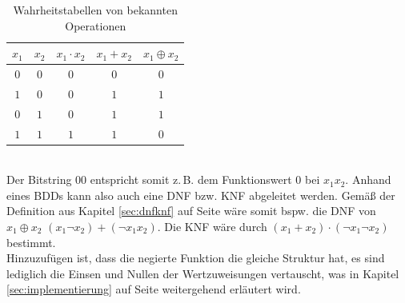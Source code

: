 \begin{table}[bth]
	\centering
	\caption{Wahrheitstabellen von bekannten Operationen}
	\label{tab:wtabelle}
	\begin{tabular}{ | c | c | c | c | c | }
		\hline
		\textbf{$x_1$} & \textbf{$x_2$} & \textbf{$x_1 \cdot x_2$} & \textbf{$x_1 + x_2$} & \textbf{$x_1 \oplus x_2$} \\ \hline
		$0$ & $0$ & $0$ & $0$ & $0$ \\ \hline
		$1$ & $0$ & $0$ & $1$ & $1$ \\ \hline
		$0$ & $1$ & $0$ & $1$ & $1$ \\ \hline
		$1$ & $1$ & $1$ & $1$ & $0$ \\ \hline
	\end{tabular}
\end{table}\\
\noindent
Der Bitstring $00$ entspricht somit z.\,B. dem Funktionswert $0$ bei $x_1x_2$. Anhand eines BDDs kann also auch eine DNF bzw. KNF abgeleitet werden. Gemäß der Definition aus Kapitel \ref{sec:dnfknf} auf Seite \pageref{sec:dnfknf} wäre somit bspw. die DNF von $x_1 \oplus x_2$ $(x_1\neg x_2) + (\neg x_1 x_2)$. Die KNF wäre durch $(x_1 + x_2) \cdot (\neg x_1 \neg x_2)$ bestimmt.\\
Hinzuzufügen ist, dass die negierte Funktion die gleiche Struktur hat, es sind lediglich die Einsen und Nullen der Wertzuweisungen vertauscht, was in Kapitel \ref{sec:implementierung} auf Seite \pageref{sec:implementierung} weitergehend erläutert wird.
